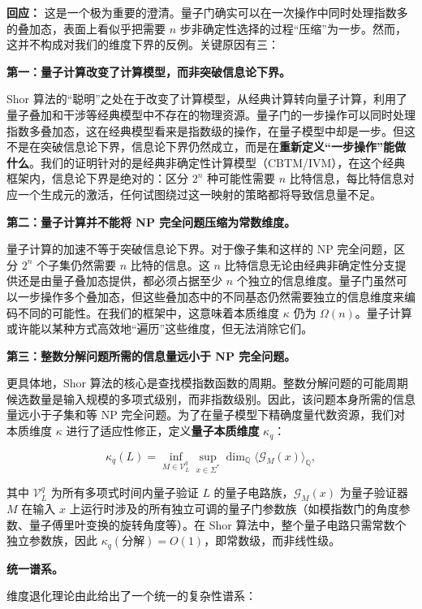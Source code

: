 \documentclass{ctexart}
\begin{document}
	\textbf{回应：} 这是一个极为重要的澄清。量子门确实可以在一次操作中同时处理指数多的叠加态，表面上看似乎把需要 $n$ 步非确定性选择的过程``压缩''为一步。然而，这并不构成对我们的维度下界的反例。关键原因有三：
	
	\textbf{第一：量子计算改变了计算模型，而非突破信息论下界。}
	
	Shor 算法的``聪明''之处在于改变了计算模型，从经典计算转向量子计算，利用了量子叠加和干涉等经典模型中不存在的物理资源。量子门的一步操作可以同时处理指数多叠加态，这在经典模型看来是指数级的操作，在量子模型中却是一步。但这不是在突破信息论下界，信息论下界仍然成立，而是在\textbf{重新定义``一步操作''能做什么}。我们的证明针对的是经典非确定性计算模型（CBTM/IVM），在这个经典框架内，信息论下界是绝对的：区分 $2^n$ 种可能性需要 $n$ 比特信息，每比特信息对应一个生成元的激活，任何试图绕过这一映射的策略都将导致信息量不足。
	
	\textbf{第二：量子计算并不能将 NP 完全问题压缩为常数维度。}
	
	量子计算的加速不等于突破信息论下界。对于像子集和这样的 NP 完全问题，区分 $2^n$ 个子集仍然需要 $n$ 比特的信息。这 $n$ 比特信息无论由经典非确定性分支提供还是由量子叠加态提供，都必须占据至少 $n$ 个独立的信息维度。量子门虽然可以一步操作多个叠加态，但这些叠加态中的不同基态仍然需要独立的信息维度来编码不同的可能性。在我们的框架中，这意味着本质维度 $\kappa$ 仍为 $\Omega(n)$。量子计算或许能以某种方式高效地``遍历''这些维度，但无法消除它们。
	
	\textbf{第三：整数分解问题所需的信息量远小于 NP 完全问题。}
	
	更具体地，Shor 算法的核心是查找模指数函数的周期。整数分解问题的可能周期候选数量是输入规模的多项式级别，而非指数级别。因此，该问题本身所需的信息量远小于子集和等 NP 完全问题。为了在量子模型下精确度量代数资源，我们对本质维度 $\kappa$ 进行了适应性修正，定义\textbf{量子本质维度} $\kappa_q$：
	
	\[
	\kappa_q(L) = \inf_{M \in \mathcal{V}_L^{q}} \sup_{x \in \Sigma^*} \dim_{\mathbb{Q}} \langle \mathcal{G}_M(x) \rangle_{\mathbb{Q}},
	\]
	
	其中 $\mathcal{V}_L^{q}$ 为所有多项式时间内量子验证 $L$ 的量子电路族，$\mathcal{G}_M(x)$ 为量子验证器 $M$ 在输入 $x$ 上运行时涉及的所有独立可调的量子门参数族（如模指数门的角度参数、量子傅里叶变换的旋转角度等）。在 Shor 算法中，整个量子电路只需常数个独立参数族，因此 $\kappa_q(\text{分解}) = O(1)$，即常数级，而非线性级。
	
	\textbf{统一谱系。}
	
	维度退化理论由此给出了一个统一的复杂性谱系：
	
\end{document}
